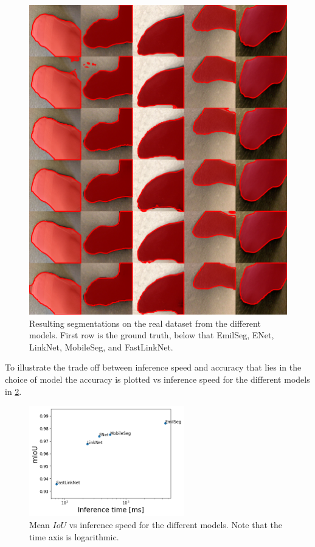 \documentclass{kththesis}
\begin{document}
\begin{figure}[h]
  \centering
  \includegraphics[width=\textwidth]{real_color}
  \caption{Resulting segmentations on the real dataset from the different models. First row is the ground
    truth, below that EmilSeg, ENet, LinkNet, MobileSeg, and FastLinkNet.}
  \label{fig:seg_real}
  \end{figure}

To illustrate the trade off between inference speed and accuracy that lies in
the choice of model the accuracy is plotted vs inference speed for the different
models in \cref{fig:speed_vs_iou}.

\begin{figure}[h]
  \centering
  \includegraphics[width=0.6\textwidth]{Speed_vs_IoU}
  \caption{Mean \(IoU\) vs inference speed for the different models. Note that
    the time axis is logarithmic.}
  \label{fig:speed_vs_iou}
\end{figure}
\end{document}
